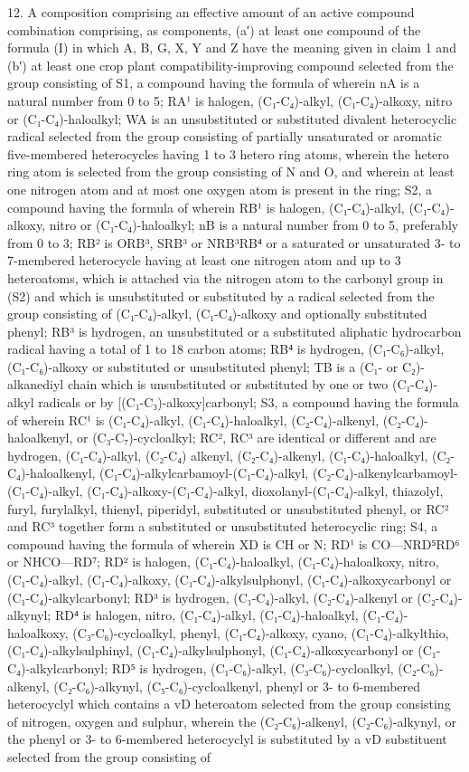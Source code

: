\documentclass[11pt,a4paper]{article}
\begin{document}
12. A composition comprising an effective amount of an active compound combination comprising, as components, (a′) at least one compound of the formula (I) in which A, B, G, X, Y and Z have the meaning given in claim 1 and (b′) at least one crop plant compatibility-improving compound selected from the group consisting of S1, a compound having the formula of wherein nA is a natural number from 0 to 5; RA¹ is halogen, (C₁-C₄)-alkyl, (C₁-C₄)-alkoxy, nitro or (C₁-C₄)-haloalkyl; WA is an unsubstituted or substituted divalent heterocyclic radical selected from the group consisting of partially unsaturated or aromatic five-membered heterocycles having 1 to 3 hetero ring atoms, wherein the hetero ring atom is selected from the group consisting of N and O, and wherein at least one nitrogen atom and at most one oxygen atom is present in the ring; S2, a compound having the formula of wherein RB¹ is halogen, (C₁-C₄)-alkyl, (C₁-C₄)-alkoxy, nitro or (C₁-C₄)-haloalkyl; nB is a natural number from 0 to 5, preferably from 0 to 3; RB² is ORB³, SRB³ or NRB³RB⁴ or a saturated or unsaturated 3- to 7-membered heterocycle having at least one nitrogen atom and up to 3 heteroatoms, which is attached via the nitrogen atom to the carbonyl group in (S2) and which is unsubstituted or substituted by a radical selected from the group consisting of (C₁-C₄)-alkyl, (C₁-C₄)-alkoxy and optionally substituted phenyl; RB³ is hydrogen, an unsubstituted or a substituted aliphatic hydrocarbon radical having a total of 1 to 18 carbon atoms; RB⁴ is hydrogen, (C₁-C₆)-alkyl, (C₁-C₆)-alkoxy or substituted or unsubstituted phenyl; TB is a (C₁- or C₂)-alkanediyl chain which is unsubstituted or substituted by one or two (C₁-C₄)-alkyl radicals or by [(C₁-C₃)-alkoxy]carbonyl; S3, a compound having the formula of wherein RC¹ is (C₁-C₄)-alkyl, (C₁-C₄)-haloalkyl, (C₂-C₄)-alkenyl, (C₂-C₄)-haloalkenyl, or (C₃-C₇)-cycloalkyl; RC², RC³ are identical or different and are hydrogen, (C₁-C₄)-alkyl, (C₂-C₄) alkenyl, (C₂-C₄)-alkenyl, (C₁-C₄)-haloalkyl, (C₂-C₄)-haloalkenyl, (C₁-C₄)-alkylcarbamoyl-(C₁-C₄)-alkyl, (C₂-C₄)-alkenylcarbamoyl-(C₁-C₄)-alkyl, (C₁-C₄)-alkoxy-(C₁-C₄)-alkyl, dioxolanyl-(C₁-C₄)-alkyl, thiazolyl, furyl, furylalkyl, thienyl, piperidyl, substituted or unsubstituted phenyl, or RC² and RC³ together form a substituted or unsubstituted heterocyclic ring; S4, a compound having the formula of wherein XD is CH or N; RD¹ is CO—NRD⁵RD⁶ or NHCO—RD⁷; RD² is halogen, (C₁-C₄)-haloalkyl, (C₁-C₄)-haloalkoxy, nitro, (C₁-C₄)-alkyl, (C₁-C₄)-alkoxy, (C₁-C₄)-alkylsulphonyl, (C₁-C₄)-alkoxycarbonyl or (C₁-C₄)-alkylcarbonyl; RD³ is hydrogen, (C₁-C₄)-alkyl, (C₂-C₄)-alkenyl or (C₂-C₄)-alkynyl; RD⁴ is halogen, nitro, (C₁-C₄)-alkyl, (C₁-C₄)-haloalkyl, (C₁-C₄)-haloalkoxy, (C₃-C₆)-cycloalkyl, phenyl, (C₁-C₄)-alkoxy, cyano, (C₁-C₄)-alkylthio, (C₁-C₄)-alkylsulphinyl, (C₁-C₄)-alkylsulphonyl, (C₁-C₄)-alkoxycarbonyl or (C₁-C₄)-alkylcarbonyl; RD⁵ is hydrogen, (C₁-C₆)-alkyl, (C₃-C₆)-cycloalkyl, (C₂-C₆)-alkenyl, (C₂-C₆)-alkynyl, (C₅-C₆)-cycloalkenyl, phenyl or 3- to 6-membered heterocyclyl which contains a vD heteroatom selected from the group consisting of nitrogen, oxygen and sulphur, wherein the (C₂-C₆)-alkenyl, (C₂-C₆)-alkynyl, or the phenyl or 3- to 6-membered heterocyclyl is substituted by a vD substituent selected from the group consisting of 
\end{document}

